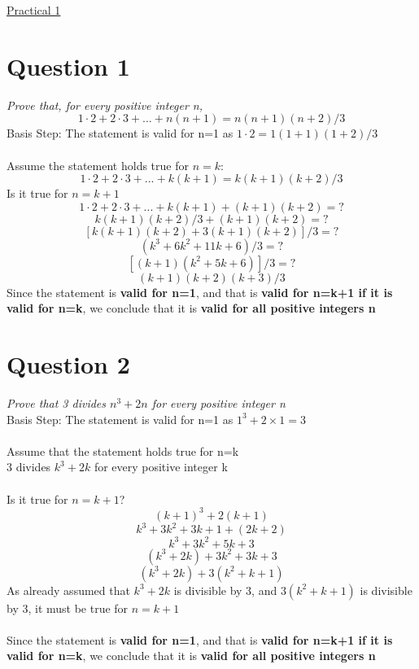 \documentclass{article}[18pt]
\begin{document}
\begin{center}
\underline{\huge Practical 1}
\end{center}
\section{Question 1}
\textit{Prove that, for every positive integer n,}
$$1 \cdot 2 + 2 \cdot 3 + . . . + n(n + 1) = n(n + 1)(n + 2)/3$$
Basis Step: The statement is valid for n=1 as $1\cdot2=1(1+1)(1+2)/3$\\
\\
Assume the statement holds true for $n=k$:
$$1 \cdot 2 + 2 \cdot 3 + . . . + k(k + 1) = k(k + 1)(k + 2)/3$$
Is it true for $n=k+1$
$$1 \cdot 2 + 2 \cdot 3 + . . . + k(k + 1) + (k+1)(k+2) = ?$$
$$k(k+1)(k+2)/3+(k+1)(k+2)=?$$
$$[k(k+1)(k+2)+3(k+1)(k+2)]/3=?$$
$$(k^3+6k^2+11k+6)/3=?$$
$$[(k+1)(k^2+5k+6)]/3=?$$
$$(k+1)(k+2)(k+3)/3$$
Since the statement is \textbf{valid for n=1}, and that is \textbf{valid for n=k+1 if it is valid for n=k}, we conclude that it is \textbf{valid for all positive integers n}
\section{Question 2}
\textit{Prove that 3 divides $n^3 + 2n$ for every positive integer n}\\
Basis Step: The statement is valid for n=1 as $1^3+2\times1=3$\\
\\
Assume that the statement holds true for n=k\\
3 divides $k^3+2k$ for every positive integer k\\
\\
Is it true for $n=k+1$?\\
$$(k+1)^3+2(k+1)$$
$$k^3+3k^2+3k+1+(2k+2)$$
$$k^3+3k^2+5k+3$$
$$(k^3+2k)+3k^2+3k+3$$
$$(k^3+2k)+3(k^2+k+1)$$
As already assumed that $k^3+2k$ is divisible by 3, and $3(k^2+k+1)$ is divisible by 3, it must be true for $n=k+1$\\
\\
Since the statement is \textbf{valid for n=1}, and that is \textbf{valid for n=k+1 if it is valid for n=k}, we conclude that it is \textbf{valid for all positive integers n}
\end{document}
